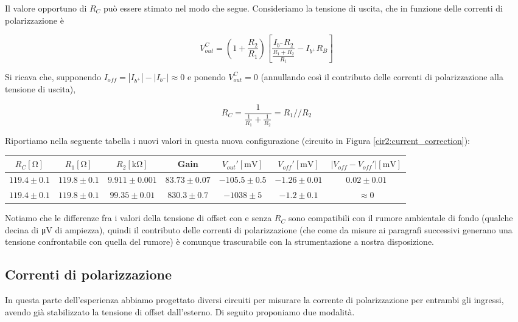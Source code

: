 Il valore opportuno di $R_C$ può essere stimato nel modo che segue. Consideriamo la tensione di uscita, che in funzione delle correnti di polarizzazione è

\begin{equation}
V_{out}^{C} = \left( 1+\frac{R_2}{R_1} \right)\left[ \frac{I_{b^-}R_2}{\frac{R_1+R_2}{R_1}} - I_{b^+} R_B\right]
\label{eq2:Vout_currents}
\end{equation}

Si ricava che, supponendo $I_{off} = |I_{b^+}|-|I_{b^-}| \approx 0$ e ponendo $V_{out}^{C}=0$ (annullando così il contributo delle correnti di polarizzazione alla tensione di uscita),

$$R_C=\frac{1}{\frac{1}{R_1} + \frac{1}{R_2}} = R_1 // R_2$$

Riportiamo nella seguente tabella i nuovi valori in questa nuova configurazione (circuito in Figura \ref{cir2:current_correction}):

\begin{center}
\begin{tabular}{c|c|c|c|c|c|c}
$R_C [\si{\ohm}]$& $R_1[\si{\ohm}]$ & $R_2[\si{\kilo\ohm}]$ & Gain & $V_{out}' [\si{\milli\volt}]$ & $V_{off}' [\si{\milli\volt}]$ & $|V_{off}-V_{off}'|[\si{\milli\volt}]$ \\ 
\hline 
$119.4\pm0.1$ & $119.8\pm0.1$ & $9.911\pm0.001$  & $83.73 \pm 0.07$ & $-105.5 \pm 0.5$ & $-1.26 \pm0.01$ & $0.02\pm0.01$ \\
\hline
$119.4\pm0.1$ & $119.8\pm0.1$ & $99.35\pm0.01$  & $830.3\pm0.7$ &$ -1038 \pm 5$ & $-1.2 \pm 0.1$ & $\approx 0$\\
\end{tabular}
\end{center}

Notiamo che le differenze fra i valori della tensione di offset con e senza $R_C$ sono compatibili con il rumore ambientale di fondo (qualche decina di \si{\micro\volt} di ampiezza), quindi il contributo delle correnti di polarizzazione (che come da misure ai paragrafi successivi generano una tensione confrontabile con quella del rumore) è comunque trascurabile con la strumentazione a nostra disposizione.

\subsection{Correnti di polarizzazione}

In questa parte dell'esperienza abbiamo progettato diversi circuiti per misurare la corrente di polarizzazione per entrambi gli ingressi, avendo già stabilizzato la tensione di offset dall'esterno. Di seguito proponiamo due modalità.


